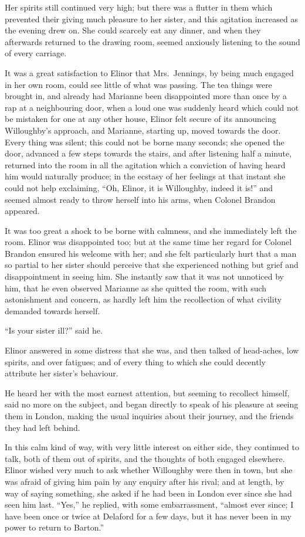 Her spirits still continued very high; but there
was a flutter in them which prevented their giving much
pleasure to her sister, and this agitation increased as
the evening drew on.  She could scarcely eat any dinner,
and when they afterwards returned to the drawing room,
seemed anxiously listening to the sound of every carriage.

It was a great satisfaction to Elinor that Mrs.\ Jennings,
by being much engaged in her own room, could see little
of what was passing.  The tea things were brought in,
and already had Marianne been disappointed more than once
by a rap at a neighbouring door, when a loud one was suddenly
heard which could not be mistaken for one at any other house,
Elinor felt secure of its announcing Willoughby's approach,
and Marianne, starting up, moved towards the door.
Every thing was silent; this could not be borne many seconds;
she opened the door, advanced a few steps towards the stairs,
and after listening half a minute, returned into the room
in all the agitation which a conviction of having heard
him would naturally produce; in the ecstasy of her
feelings at that instant she could not help exclaiming,
``Oh, Elinor, it is Willoughby, indeed it is!'' and seemed
almost ready to throw herself into his arms, when Colonel
Brandon appeared.

It was too great a shock to be borne with calmness,
and she immediately left the room.  Elinor was disappointed too;
but at the same time her regard for Colonel Brandon ensured
his welcome with her; and she felt particularly hurt that
a man so partial to her sister should perceive that she
experienced nothing but grief and disappointment in seeing him.
She instantly saw that it was not unnoticed by him,
that he even observed Marianne as she quitted the room,
with such astonishment and concern, as hardly left him
the recollection of what civility demanded towards herself.

``Is your sister ill?'' said he.

Elinor answered in some distress that she was,
and then talked of head-aches, low spirits, and over fatigues;
and of every thing to which she could decently attribute
her sister's behaviour.

He heard her with the most earnest attention,
but seeming to recollect himself, said no more on the subject,
and began directly to speak of his pleasure at seeing them
in London, making the usual inquiries about their journey,
and the friends they had left behind.

In this calm kind of way, with very little interest
on either side, they continued to talk, both of them out
of spirits, and the thoughts of both engaged elsewhere.
Elinor wished very much to ask whether Willoughby were
then in town, but she was afraid of giving him pain
by any enquiry after his rival; and at length, by way
of saying something, she asked if he had been in London
ever since she had seen him last.  ``Yes,'' he replied,
with some embarrassment, ``almost ever since; I have been
once or twice at Delaford for a few days, but it has never
been in my power to return to Barton.''

